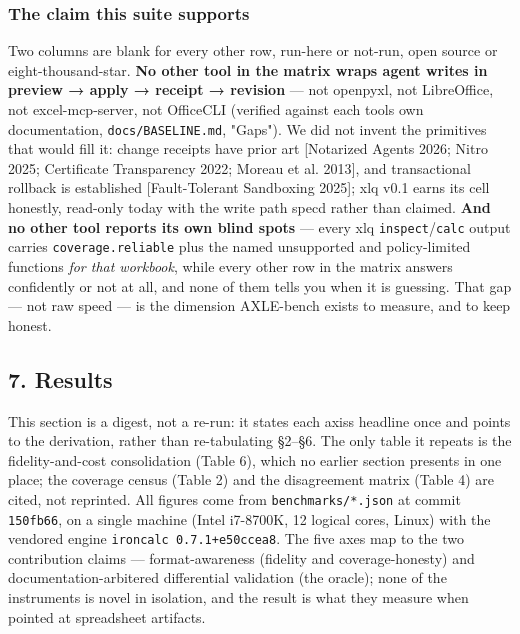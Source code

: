 \documentclass[
]{article}
\newcounter{none} %
\begin{document}
\subsubsection{The claim this suite
supports}\label{the-claim-this-suite-supports}

Two columns are blank for every other row, run-here or not-run, open
source or eight-thousand-star. \textbf{No other tool in the matrix wraps
agent writes in preview → apply → receipt → revision} --- not openpyxl,
not LibreOffice, not excel-mcp-server, not OfficeCLI (verified against
each tool\textquotesingle s own documentation,
\texttt{docs/BASELINE.md}, "Gaps"). We did not invent the primitives
that would fill it: change receipts have prior art {[}Notarized Agents
2026; Nitro 2025; Certificate Transparency 2022; Moreau et al. 2013{]},
and transactional rollback is established {[}Fault-Tolerant Sandboxing
2025{]}; xlq v0.1 earns its cell honestly, read-only today with the
write path spec\textquotesingle d rather than claimed. \textbf{And no
other tool reports its own blind spots} --- every xlq
\texttt{inspect}/\texttt{calc} output carries \texttt{coverage.reliable}
plus the named unsupported and policy-limited functions \emph{for that
workbook}, while every other row in the matrix answers confidently or
not at all, and none of them tells you when it is guessing. That gap ---
not raw speed --- is the dimension AXLE-bench exists to measure, and to
keep honest.

\subsection{7. Results}\label{7-results}

This section is a digest, not a re-run: it states each
axis\textquotesingle s headline once and points to the derivation,
rather than re-tabulating §2--§6. The only table it repeats is the
fidelity-and-cost consolidation (Table 6), which no earlier section
presents in one place; the coverage census (Table 2) and the
disagreement matrix (Table 4) are cited, not reprinted. All figures come
from \texttt{benchmarks/*.json} at commit \texttt{150fb66}, on a single
machine (Intel i7-8700K, 12 logical cores, Linux) with the vendored
engine \texttt{ironcalc\ 0.7.1+e50ccea8}. The five axes map to the two
contribution claims --- format-awareness (fidelity and coverage-honesty)
and documentation-arbitered differential validation (the oracle); none
of the instruments is novel in isolation, and the result is what they
measure when pointed at spreadsheet artifacts.
\end{document}

